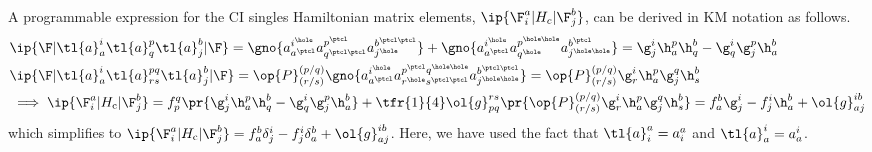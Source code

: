 \begin{ex}
A programmable expression for the CI singles Hamiltonian matrix elements, $\ip{\F_i^a|H_c|\F_j^b}$,  can be derived in KM notation as follows.
\begin{align*}
&
  \ip{\F|\tl{a}_a^i\tl{a}_q^p\tl{a}_j^b|\F}
=
  \gno{
    a_{a^\ptcl}^{i^\hole}
    a_{q^{\ptcl\ptcl}}^{p^\ptcl}
    a_{j^\hole}^{b^{\ptcl\ptcl}}
  }
+
  \gno{
    a_{a^\ptcl}^{i^{\hole}}
    a_{q^{\hole}}^{p^{\hole\hole}}
    a_{j^{\hole\hole}}^{b^{\ptcl}}
  }
=
  \g^i_j\h_a^p\h_q^b
-
  \g_q^i\g_j^p\h_a^b
\\
&
  \ip{\F|\tl{a}_a^i\tl{a}^{pq}_{rs}\tl{a}_j^b|\F}
=
  \op{P}^{(p/q)}_{(r/s)}
  \gno{
    a^{i^\hole}_{a^\ptcl}
    a^{p^\ptcl q^{\hole\hole}}_{r^\hole s^{\ptcl\ptcl}}
    a^{b^{\ptcl\ptcl}}_{j^{\hole\hole}}
  }
=
  \op{P}^{(p/q)}_{(r/s)}
  \g^i_r\h^p_a\g^q_j\h^b_s
\\
&
\implies
  \ip{\F_i^a|H_{\text{c}}|\F_j^b}
=
  f_p^q\pr{
    \g^i_j\h_a^p\h_q^b
  -
    \g_q^i\g_j^p\h_a^b
  }
+
  \tfr{1}{4}
  \ol{g}_{pq}^{rs}\pr{
    \op{P}^{(p/q)}_{(r/s)}
    \g^i_r\h^p_a\g^q_j\h^b_s
  }
=
  f_a^b\g_j^i
-
  f_j^i\h_a^b
+
  \ol{g}^{ib}_{aj}
\end{align*}
which simplifies to
$\ip{\F_i^a|H_{\text{c}}|\F_j^b}=f_a^b\delta_j^i-f_j^i\delta_a^b+\ol{g}^{ib}_{aj}$.
Here, we have used the fact that $\tl{a}_i^a=a_i^a$ and $\tl{a}_a^i=a_a^i$.
\end{ex}

